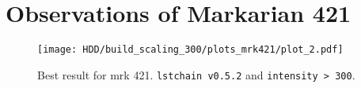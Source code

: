 \section{Observations of Markarian 421}

\begin{figure}
    \centering
    \texttt{[image: HDD/build\_scaling\_300/plots\_mrk421/plot\_2.pdf]}
    \caption{Best result for mrk 421. \texttt{lstchain v0.5.2} and \texttt{intensity > 300}.}
    \label{fig:mrk_best}
\end{figure}
